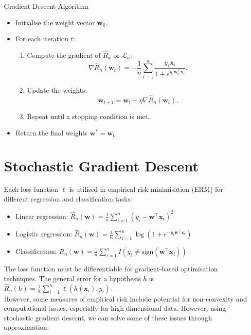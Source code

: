 \begin{definitionbox}{Gradient Descent Algorithm}
\begin{itemize}
    \item Initialise the weight vector \( \mathbf{w}_0 \).
    \item For each iteration \( t \):
    \begin{enumerate}
        \item Compute the gradient of \( \hat{R}_n \) or \( \mathcal{L}_n \):
        \[ \nabla\hat{R}_n(\mathbf{w}_t) = -\frac{1}{n} \sum_{i=1}^{n} \frac{y_i\mathbf{x}_i}{1 + e^{y_i\mathbf{w}_t^\top\mathbf{x}_i}}. \]
        \item Update the weights:
        \[ \mathbf{w}_{t+1} = \mathbf{w}_t - \eta\nabla\hat{R}_n(\mathbf{w}_t). \]
        \item Repeat until a stopping condition is met.
    \end{enumerate}
    \item Return the final weights \( \mathbf{w}^* = \mathbf{w}_t \).
\end{itemize}    
\end{definitionbox}

\section{Stochastic Gradient Descent}
Each loss function \( \ell \) is utilised in empirical risk minimisation (ERM) for different regression and classification tasks:

\begin{itemize}
  \item Linear regression: \( \hat{R}_n(\mathbf{w}) = \frac{1}{n}\sum_{i=1}^n (y_i - \mathbf{w}^\top\mathbf{x}_i)^2 \)
  \item Logistic regression: \( \hat{R}_n(\mathbf{w}) = \frac{1}{n}\sum_{i=1}^n \log(1 + e^{-y_i\mathbf{w}^\top\mathbf{x}_i}) \)
  \item Classification: \( R_n(\mathbf{w}) = \frac{1}{n}\sum_{i=1}^n I(y_i \neq \text{sign}(\mathbf{w}^\top\mathbf{x}_i)) \) 
\end{itemize}

The loss function must be differentiable for gradient-based optimisation techniques. The general error for a hypothesis \( h \) is \( \hat{R}_n(h) = \frac{1}{n} \sum_{i=1}^n \ell(h(\mathbf{x}_i), y_i) \).\\

However, some measures of empirical risk include potential for non-convexity and computational issues, especially for high-dimensional data. However, using stochastic gradient descent, we can solve some of these issues through approximation.

